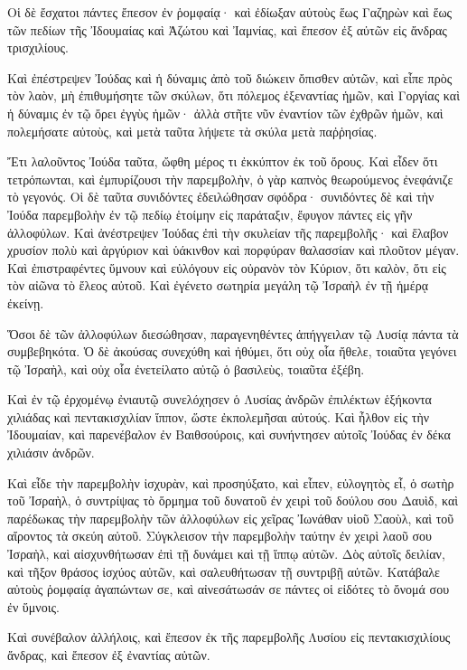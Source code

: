 {Οἱ δὲ ἔσχατοι πάντες ἔπεσον ἐν ῥομφαίᾳ· καὶ ἐδίωξαν αὐτοὺς ἕως Γαζηρὼν καὶ ἕως τῶν πεδίων τῆς Ἰδουμαίας καὶ Ἀζώτου καὶ Ἰαμνίας, καὶ ἔπεσον ἐξ αὐτῶν εἰς ἄνδρας τρισχιλίους.
\par }{\PP {}Καὶ ἐπέστρεψεν Ἰούδας καὶ ἡ δύναμις ἀπὸ τοῦ διώκειν ὄπισθεν αὐτῶν,
καὶ εἶπε πρὸς τὸν λαὸν, μὴ ἐπιθυμήσητε τῶν σκύλων, ὅτι πόλεμος ἐξεναντίας ἡμῶν,
καὶ Γοργίας καὶ ἡ δύναμις ἐν τῷ ὄρει ἐγγὺς ἡμῶν· ἀλλὰ στῆτε νῦν ἐναντίον τῶν ἐχθρῶν ἡμῶν, καὶ πολεμήσατε αὐτοὺς, καὶ μετὰ ταῦτα λήψετε τὰ σκύλα μετὰ παῤῥησίας.
\par }{\PP {}Ἔτι λαλοῦντος Ἰούδα ταῦτα, ὤφθη μέρος τι ἐκκύπτον ἐκ τοῦ ὄρους.
Καὶ εἶδεν ὅτι τετρόπωνται, καὶ ἐμπυρίζουσι τὴν παρεμβολὴν, ὁ γὰρ καπνὸς θεωρούμενος ἐνεφάνιζε τὸ γεγονός.
Οἱ δὲ ταῦτα συνιδόντες ἐδειλώθησαν σφόδρα· συνιδόντες δὲ καὶ τὴν Ἰούδα παρεμβολὴν ἐν τῷ πεδίῳ ἑτοίμην εἰς παράταξιν,
ἔφυγον πάντες εἰς γῆν ἀλλοφύλων.
Καὶ ἀνέστρεψεν Ἰούδας ἐπὶ τὴν σκυλείαν τῆς παρεμβολῆς· καὶ ἔλαβον χρυσίον πολὺ καὶ ἀργύριον καὶ ὑάκινθον καὶ πορφύραν θαλασσίαν καὶ πλοῦτον μέγαν.
Καὶ ἐπιστραφέντες ὕμνουν καὶ εὐλόγουν εἰς οὐρανὸν τὸν Κύριον, ὅτι καλὸν, ὅτι εἰς τὸν αἰῶνα τὸ ἔλεος αὐτοῦ.
Καὶ ἐγένετο σωτηρία μεγάλη τῷ Ἰσραὴλ ἐν τῇ ἡμέρᾳ ἐκείνῃ.
\par }{\PP {}Ὅσοι δὲ τῶν ἀλλοφύλων διεσώθησαν, παραγενηθέντες ἀπήγγειλαν τῷ Λυσίᾳ πάντα τὰ συμβεβηκότα.
Ὁ δὲ ἀκούσας συνεχύθη καὶ ἠθύμει, ὅτι οὐχ οἷα ἤθελε, τοιαῦτα γεγόνει τῷ Ἰσραὴλ, καὶ οὐχ οἷα ἐνετείλατο αὐτῷ ὁ βασιλεὺς, τοιαῦτα ἐξέβη.
\par }{\PP {}Καὶ ἐν τῷ ἐρχομένῳ ἐνιαυτῷ συνελόχησεν ὁ Λυσίας ἀνδρῶν ἐπιλέκτων ἑξήκοντα χιλιάδας καὶ πεντακισχιλίαν ἵππον, ὥστε ἐκπολεμῆσαι αὐτούς.
Καὶ ἦλθον εἰς τὴν Ἰδουμαίαν, καὶ παρενέβαλον ἐν Βαιθσούροις, καὶ συνήντησεν αὐτοῖς Ἰούδας ἐν δέκα χιλιάσιν ἀνδρῶν.
\par }{\PP {}Καὶ εἶδε τὴν παρεμβολὴν ἰσχυρὰν, καὶ προσηύξατο, καὶ εἶπεν, εὐλογητὸς εἶ, ὁ σωτὴρ τοῦ Ἰσραὴλ, ὁ συντρίψας τὸ ὅρμημα τοῦ δυνατοῦ ἐν χειρὶ τοῦ δούλου σου Δαυὶδ, καὶ παρέδωκας τὴν παρεμβολὴν τῶν ἀλλοφύλων εἰς χεῖρας Ἰωνάθαν υἱοῦ Σαοὺλ, καὶ τοῦ αἴροντος τὰ σκεύη αὐτοῦ.
Σύγκλεισον τὴν παρεμβολὴν ταύτην ἐν χειρὶ λαοῦ σου Ἰσραὴλ, καὶ αἰσχυνθήτωσαν ἐπὶ τῇ δυνάμει καὶ τῇ ἵππῳ αὐτῶν.
Δὸς αὐτοῖς δειλίαν, καὶ τῆξον θράσος ἰσχύος αὐτῶν, καὶ σαλευθήτωσαν τῇ συντριβῇ αὐτῶν.
Κατάβαλε αὐτοὺς ῥομφαίᾳ ἀγαπώντων σε, καὶ αἰνεσάτωσάν σε πάντες οἱ εἰδότες τὸ ὄνομά σου ἐν ὕμνοις.
\par }{\PP {}Καὶ συνέβαλον ἀλλήλοις, καὶ ἔπεσον ἐκ τῆς παρεμβολῆς Λυσίου εἰς πεντακισχιλίους ἄνδρας, καὶ ἔπεσον ἐξ ἐναντίας αὐτῶν.
}
